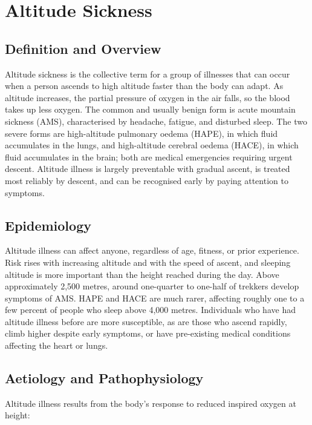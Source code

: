 \chapter{Altitude Sickness}

\section*{Definition and Overview}
Altitude sickness is the collective term for a group of illnesses that can occur when a person ascends to high altitude faster than the body can adapt. As altitude increases, the partial pressure of oxygen in the air falls, so the blood takes up less oxygen. The common and usually benign form is acute mountain sickness (AMS), characterised by headache, fatigue, and disturbed sleep. The two severe forms are high-altitude pulmonary oedema (HAPE), in which fluid accumulates in the lungs, and high-altitude cerebral oedema (HACE), in which fluid accumulates in the brain; both are medical emergencies requiring urgent descent. Altitude illness is largely preventable with gradual ascent, is treated most reliably by descent, and can be recognised early by paying attention to symptoms.

\section*{Epidemiology}
Altitude illness can affect anyone, regardless of age, fitness, or prior experience. Risk rises with increasing altitude and with the speed of ascent, and sleeping altitude is more important than the height reached during the day. Above approximately 2,500 metres, around one-quarter to one-half of trekkers develop symptoms of AMS. HAPE and HACE are much rarer, affecting roughly one to a few percent of people who sleep above 4,000 metres. Individuals who have had altitude illness before are more susceptible, as are those who ascend rapidly, climb higher despite early symptoms, or have pre-existing medical conditions affecting the heart or lungs.

\section*{Aetiology and Pathophysiology}
Altitude illness results from the body's response to reduced inspired oxygen at height:

